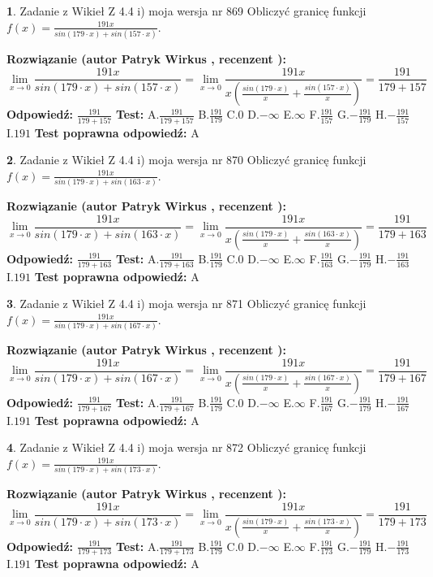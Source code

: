 \documentclass[12pt, a4paper]{article}
\theoremstyle{definition} %
\newtheorem{zad}{}
\newcommand{\zadStart}[1]{\begin{zad}#1\newline}
\newcommand{\zadStop}{\end{zad}}
\newcommand{\rozwStart}[2]{\noindent \textbf{Rozwiązanie (autor #1 , recenzent #2): }\newline}
\newcommand{\rozwStop}{\newline}
\newcommand{\odpStart}{\noindent \textbf{Odpowiedź:}\newline}
\newcommand{\odpStop}{\newline}
\newcommand{\testStart}{\noindent \textbf{Test:}\newline}
\newcommand{\testStop}{\newline}
\newcommand{\kluczStart}{\noindent \textbf{Test poprawna odpowiedź:}\newline}
\newcommand{\kluczStop}{\newline}
\begin{document}
\zadStart{Zadanie z Wikieł Z 4.4 i) moja wersja nr 869}
Obliczyć granicę funkcji $f(x)=\frac{191x}{sin(179\cdot x) +sin(157\cdot x)}$.
\zadStop
\rozwStart{Patryk Wirkus}{}
$$\lim\limits_{x\to 0}\frac{191x}{sin(179\cdot x) +sin(157\cdot x)}=\lim\limits_{x\to 0}\frac{191x}{x(\frac{sin(179\cdot x)}{x}+\frac{sin(157\cdot x)}{x})}=\frac{191}{179+157}$$
\rozwStop
\odpStart
$\frac{191}{179+157}$
\odpStop
\testStart
A.$\frac{191}{179+157}$
B.$\frac{191}{179}$
C.$0$
D.$-\infty$
E.$\infty$
F.$\frac{191}{157}$
G.$-\frac{191}{179}$
H.$-\frac{191}{157}$
I.$191$
\testStop
\kluczStart
A
\kluczStop



\zadStart{Zadanie z Wikieł Z 4.4 i) moja wersja nr 870}
Obliczyć granicę funkcji $f(x)=\frac{191x}{sin(179\cdot x) +sin(163\cdot x)}$.
\zadStop
\rozwStart{Patryk Wirkus}{}
$$\lim\limits_{x\to 0}\frac{191x}{sin(179\cdot x) +sin(163\cdot x)}=\lim\limits_{x\to 0}\frac{191x}{x(\frac{sin(179\cdot x)}{x}+\frac{sin(163\cdot x)}{x})}=\frac{191}{179+163}$$
\rozwStop
\odpStart
$\frac{191}{179+163}$
\odpStop
\testStart
A.$\frac{191}{179+163}$
B.$\frac{191}{179}$
C.$0$
D.$-\infty$
E.$\infty$
F.$\frac{191}{163}$
G.$-\frac{191}{179}$
H.$-\frac{191}{163}$
I.$191$
\testStop
\kluczStart
A
\kluczStop



\zadStart{Zadanie z Wikieł Z 4.4 i) moja wersja nr 871}
Obliczyć granicę funkcji $f(x)=\frac{191x}{sin(179\cdot x) +sin(167\cdot x)}$.
\zadStop
\rozwStart{Patryk Wirkus}{}
$$\lim\limits_{x\to 0}\frac{191x}{sin(179\cdot x) +sin(167\cdot x)}=\lim\limits_{x\to 0}\frac{191x}{x(\frac{sin(179\cdot x)}{x}+\frac{sin(167\cdot x)}{x})}=\frac{191}{179+167}$$
\rozwStop
\odpStart
$\frac{191}{179+167}$
\odpStop
\testStart
A.$\frac{191}{179+167}$
B.$\frac{191}{179}$
C.$0$
D.$-\infty$
E.$\infty$
F.$\frac{191}{167}$
G.$-\frac{191}{179}$
H.$-\frac{191}{167}$
I.$191$
\testStop
\kluczStart
A
\kluczStop



\zadStart{Zadanie z Wikieł Z 4.4 i) moja wersja nr 872}
Obliczyć granicę funkcji $f(x)=\frac{191x}{sin(179\cdot x) +sin(173\cdot x)}$.
\zadStop
\rozwStart{Patryk Wirkus}{}
$$\lim\limits_{x\to 0}\frac{191x}{sin(179\cdot x) +sin(173\cdot x)}=\lim\limits_{x\to 0}\frac{191x}{x(\frac{sin(179\cdot x)}{x}+\frac{sin(173\cdot x)}{x})}=\frac{191}{179+173}$$
\rozwStop
\odpStart
$\frac{191}{179+173}$
\odpStop
\testStart
A.$\frac{191}{179+173}$
B.$\frac{191}{179}$
C.$0$
D.$-\infty$
E.$\infty$
F.$\frac{191}{173}$
G.$-\frac{191}{179}$
H.$-\frac{191}{173}$
I.$191$
\testStop
\kluczStart
A
\kluczStop
\end{document}
